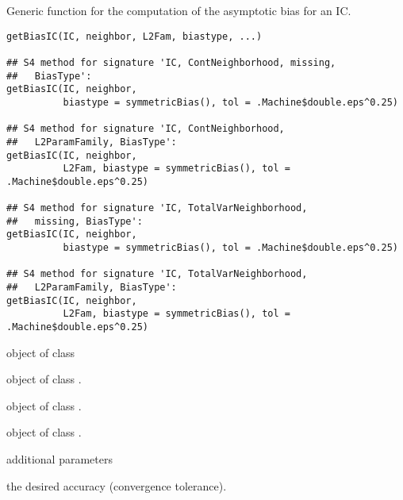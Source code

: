 \begin{Description}\relax
Generic function for the computation of the asymptotic bias for an IC.
\end{Description}
\begin{Usage}
\begin{verbatim}
getBiasIC(IC, neighbor, L2Fam, biastype, ...)

## S4 method for signature 'IC, ContNeighborhood, missing,
##   BiasType':
getBiasIC(IC, neighbor, 
          biastype = symmetricBias(), tol = .Machine$double.eps^0.25)

## S4 method for signature 'IC, ContNeighborhood,
##   L2ParamFamily, BiasType':
getBiasIC(IC, neighbor, 
          L2Fam, biastype = symmetricBias(), tol = .Machine$double.eps^0.25)

## S4 method for signature 'IC, TotalVarNeighborhood,
##   missing, BiasType':
getBiasIC(IC, neighbor, 
          biastype = symmetricBias(), tol = .Machine$double.eps^0.25)

## S4 method for signature 'IC, TotalVarNeighborhood,
##   L2ParamFamily, BiasType':
getBiasIC(IC, neighbor, 
          L2Fam, biastype = symmetricBias(), tol = .Machine$double.eps^0.25)
\end{verbatim}
\end{Usage}
\begin{Arguments}
\begin{ldescription}
\item[\code{IC}] object of class  
\item[\code{neighbor}] object of class . 
\item[\code{L2Fam}] object of class . 
\item[\code{biastype}] object of class . 
\item[\code{...}] additional parameters 
\item[\code{tol}] the desired accuracy (convergence tolerance).
\end{ldescription}
\end{Arguments}
